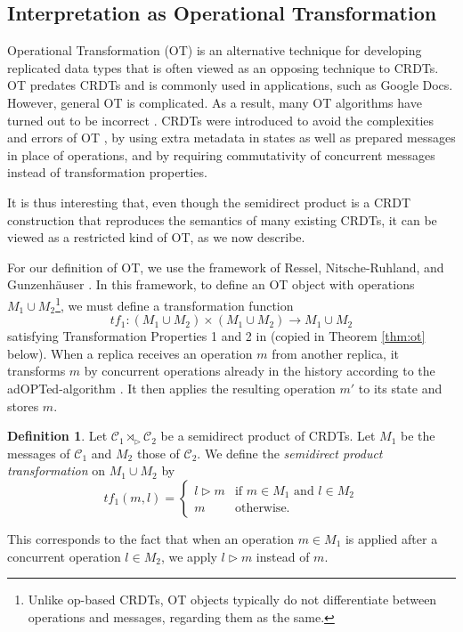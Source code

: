 \documentclass[acmsmall,nonacm]{acmart}
\newcommand{\mc}[1]{\ensuremath{\mathcal{#1}}}
\newcommand{\ra}{\rightarrow}
\newcommand{\act}{\triangleright}
\theoremstyle{plain}
\theoremstyle{definition}
\newtheorem{mydef}[mythm]{Definition}
\begin{document}
\subsection{Interpretation as Operational Transformation}
\label{sec:ot}
Operational Transformation (OT) is an alternative technique for developing replicated data types that is often viewed as an opposing technique to CRDTs.  OT predates CRDTs and is commonly used in applications, such as Google Docs.  However, general OT is complicated.  As a result, many OT algorithms have turned out to be incorrect \cite{ot_correctness}.  CRDTs were introduced to avoid the complexities and errors of OT \cite{treedoc_crdt, crdt_survey_2011}, by using extra metadata in states as well as prepared messages in place of operations, and by requiring commutativity of concurrent messages instead of transformation properties.

It is thus interesting that, even though the semidirect product is a CRDT construction that reproduces the semantics of many existing CRDTs, it can be viewed as a restricted kind of OT, as we now describe.

For our definition of OT, we use the framework of Ressel, Nitsche-Ruhland, and Gunzenh\"auser \cite{ot_ressel}.  In this framework, to define an OT object with operations $M_1 \cup M_2$\footnote{Unlike op-based CRDTs, OT objects typically do not differentiate between operations and messages, regarding them as the same.}, we must define a transformation function $$tf_1: (M_1 \cup M_2) \times (M_1 \cup M_2) \ra M_1 \cup M_2$$ satisfying Transformation Properties 1 and 2 in \cite{ot_ressel} (copied in Theorem \ref{thm:ot} below).  When a replica receives an operation $m$ from another replica, it transforms $m$ by concurrent operations already in the history according to the adOPTed-algorithm \cite[Figure 8]{ot_ressel}.  It then applies the resulting operation $m'$ to its state and stores $m$.

\begin{mydef}
Let $\mc{C}_1 \rtimes_\act \mc{C}_2$ be a semidirect product of CRDTs.  Let $M_1$ be the messages of $\mc{C}_1$ and $M_2$ those of $\mc{C}_2$.  We define the \textit{semidirect product transformation} on $M_1 \cup M_2$ by
\[
tf_1(m, l) = \begin{cases} l \act m &\mbox{if $m \in M_1$ and $l \in M_2$} \\ m &\mbox{otherwise.} \end{cases}
\]
\end{mydef}
This corresponds to the fact that when an operation $m \in M_1$ is applied after a concurrent operation $l \in M_2$, we apply $l \act m$ instead of $m$.
\end{document}
